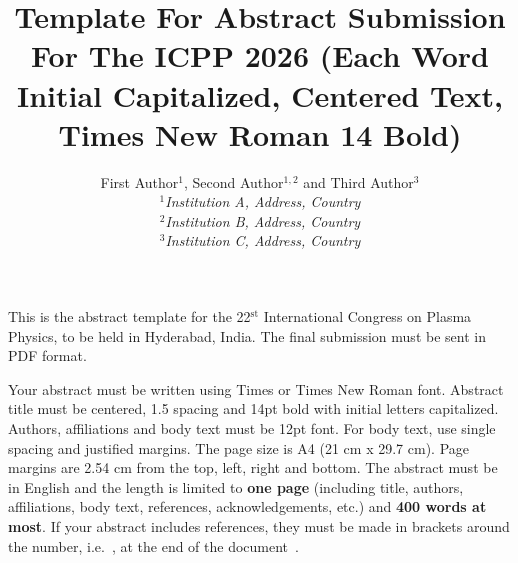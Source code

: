 \documentclass[12pt]{article}
\begin{document}
\title{Template For Abstract Submission For The ICPP 2026 (Each Word Initial Capitalized, Centered Text, Times New Roman 14 Bold)}

\author{First Author$^{1}$, Second Author$^{1,2}$ and Third Author$^{3}$\\
        $^{1}$\textit{Institution A, Address, Country}\\
        $^{2}$\textit{Institution B, Address, Country}\\
        $^{3}$\textit{Institution C, Address, Country}\\
       }
\date{}
\maketitle
\thispagestyle{empty}
\vspace{-4.5em}


This is the abstract template for the 22$^\mathrm{st}$ International Congress on Plasma Physics, to be held in Hyderabad, India. The final submission must be sent in PDF format. 

Your abstract must be written using Times or Times New Roman font. Abstract title must be centered, 1.5 spacing and 14pt bold with initial letters capitalized. Authors, affiliations and body text must be 12pt font. For body text, use single spacing and justified margins. The page size is A4 (21 cm x 29.7 cm). Page margins are 2.54 cm from the top, left, right and bottom. The abstract must be in English and the length is limited to \textbf{one page} (including title, authors, affiliations, body text, references, acknowledgements, etc.) and \textbf{400 words at most}. If your abstract includes references, they must be made in brackets around the number, i.e.~\cite{interestingpaper}, at the end of the document~\cite{anotherpaper}.
\end{document}
